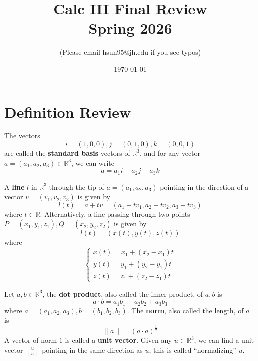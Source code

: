 \documentclass[openany]{book}
\title{Calc III Final Review
\\ 
\vspace{0.4cm}
\large Spring 2026}
\author{(Please email hsun95@jh.edu if you see typos)}
\date{\today}
\newcommand{\R}{\mathbb{R}}
\begin{document}
\maketitle

\tableofcontents
\newpage



\chapter{Definition Review}

\begin{defn}[standard basis in $\R^3$]
    The vectors 
    \begin{equation*}
        i=(1,0,0), j=(0,1,0), k=(0,0,1)
    \end{equation*}
    are called the \textbf{standard basis} vectors of $\R^3$, and for any vector $a=(a_1,a_2,a_3)\in\R^3$, we can write 
    \begin{equation*}
        a=a_1i+a_2j+a_3k
    \end{equation*}
\end{defn}




\begin{defn}\label{line}
    A \textbf{line} $l$ in $\R^3$ through the tip of $a=(a_1,a_2,a_3)$ pointing in the direction of a vector $v=(v_1,v_2,v_3)$ is given by 
    \begin{equation*}
        l(t)=a+tv=(a_1+tv_1, a_2+tv_2, a_3+tv_3)
    \end{equation*}
    where $t\in\R$. Alternatively, a line passing through two points $P=(x_1,y_1,z_1), Q=(x_2,y_2,z_2)$ is given by 
    \begin{equation*}
        l(t)=(x(t), y(t), z(t))
    \end{equation*}
    where 
    \begin{equation*}
        \begin{cases}
            x(t)=x_1+(x_2-x_1)t\\
            y(t)=y_1+(y_2-y_1)t\\
            z(t)=z_1+(z_2-z_1)t
        \end{cases}
    \end{equation*}
\end{defn}



\begin{defn}
    Let $a,b\in\R^3$, the \textbf{dot product}, also called the inner product, of $a,b$ is 
    \begin{equation*}
        a\cdot b=a_1b_1+a_2b_2+a_3b_3
    \end{equation*}
    where $a=(a_1,a_2,a_3), b=(b_1,b_2,b_3)$. The \textbf{norm}, also called the length, of $a$ is 
    \begin{equation*}
        \|a\|=(a\cdot a)^\frac{1}{2}
    \end{equation*}
    A vector of norm $1$ is called a \textbf{unit vector}. Given any $u\in\R^3$, we can find a unit vector $\frac{u}{\|u\|}$ pointing in the same direction as $u$, this is called ``normalizing'' $u$.
\end{defn}
\end{document}
